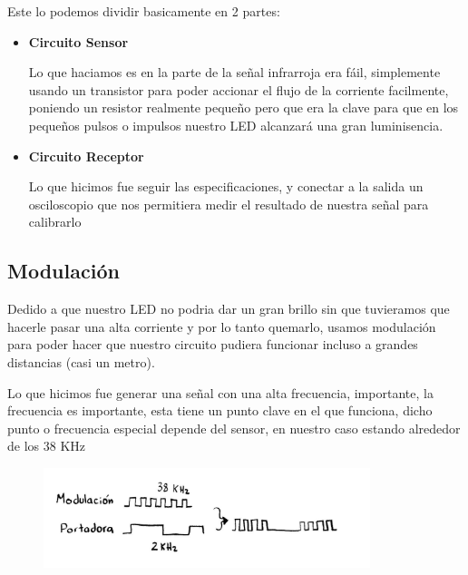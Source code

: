 \documentclass[12pt, fleqn]{article}                            %
\theoremstyle{break}                                            %
\begin{document}
        Este lo podemos dividir basicamente en 2 partes:
        \begin{itemize}
            \item 
                \textbf{Circuito Sensor}

                Lo que haciamos es en la parte de la señal infrarroja era
                fáil, simplemente usando un transistor para poder accionar
                el flujo de la corriente facilmente, poniendo un resistor
                realmente pequeño pero que era la clave para que en los pequeños
                pulsos o impulsos nuestro LED alcanzará una gran luminisencia.
            \item 
                \textbf{Circuito Receptor}

                Lo que hicimos fue seguir las especificaciones, y conectar a la salida un osciloscopio
                que nos permitiera medir el resultado de nuestra señal para calibrarlo

        \end{itemize}


    \clearpage
    \subsection{Modulación}

        Dedido a que nuestro LED no podria dar un gran brillo sin que tuvieramos que hacerle pasar
        una alta corriente y por lo tanto quemarlo, usamos modulación para poder hacer que nuestro circuito
        pudiera funcionar incluso a grandes distancias (casi un metro).

        Lo que hicimos fue generar una señal con una alta frecuencia, importante, la frecuencia
        es importante, esta tiene un punto clave en el que funciona, dicho punto o frecuencia
        especial depende del sensor, en nuestro caso estando alrededor de los 38 KHz

        \begin{figure}[h]
            \centering
            \includegraphics[width=0.85\textwidth]{Diagram2}
        \end{figure}
\end{document}
